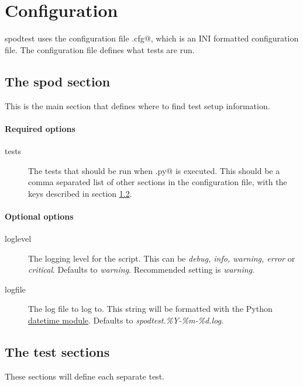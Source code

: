 \section{Configuration}
\gls{spodtest} uses the configuration file \verb@spodconf.cfg@, which is an INI
formatted configuration file. The configuration file defines what tests are
run.

\subsection{The spod section}
This is the main section that defines where to find test setup information. 

\paragraph*{Required options}

\begin{description}
    \item[tests] The tests that should be run when \verb@spodtest.py@ is
        executed. This should be a comma separated list of other sections in
        the configuration file, with the keys described in section
        \ref{sec:test_sec}.
\end{description}

\paragraph*{Optional options}

\begin{description}
    \item[loglevel] The logging level for the script. This can be
        \textit{debug, info, warning, error} or \textit{critical}. Defaults to
        \textit{warning}. Recommended setting is \textit{warning}.
    \item[logfile] The log file to log to. This string will be formatted with
        the Python
        \href{http://docs.python.org/library/datetime.html#strftime-and-strptime-behavior}{datetime module}. 
        Defaults to \textit{spodtest.\%Y-\%m-\%d.log}.
\end{description}


\subsection{The test sections}
\label{sec:test_sec}

These sections will define each separate test.

